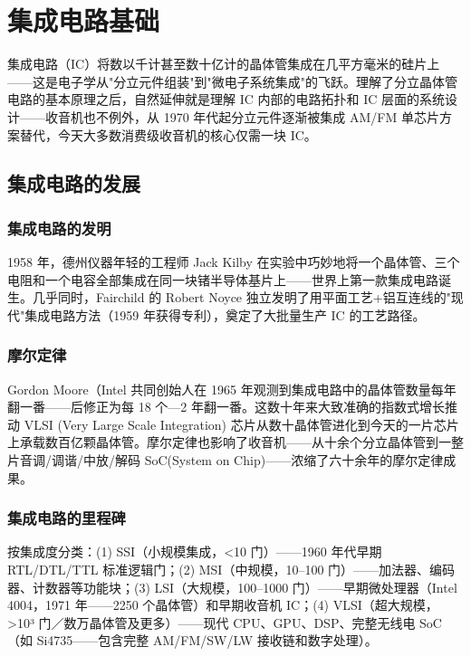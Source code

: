 \documentclass[12pt,UTF8]{ctexbook}
\begin{document}
\chapter{集成电路基础}
\label{chap:ic_basics}

集成电路（IC）将数以千计甚至数十亿计的晶体管集成在几平方毫米的硅片上——这是电子学从"分立元件组装"到"微电子系统集成"的飞跃。理解了分立晶体管电路的基本原理之后，自然延伸就是理解 IC 内部的电路拓扑和 IC 层面的系统设计——收音机也不例外，从 1970 年代起分立元件逐渐被集成 AM/FM 单芯片方案替代，今天大多数消费级收音机的核心仅需一块 IC。

\section{集成电路的发展}
\label{sec:ic_history}

\subsection{集成电路的发明}

1958 年，德州仪器年轻的工程师 Jack Kilby 在实验中巧妙地将一个晶体管、三个电阻和一个电容全部集成在同一块锗半导体基片上——世界上第一款集成电路诞生。几乎同时，Fairchild 的 Robert Noyce 独立发明了用平面工艺+铝互连线的"现代"集成电路方法（1959 年获得专利），奠定了大批量生产 IC 的工艺路径。

\subsection{摩尔定律}

Gordon Moore（Intel 共同创始人在 1965 年观测到集成电路中的晶体管数量每年翻一番——后修正为每 18 个—2 年翻一番。这数十年来大致准确的指数式增长推动 VLSI (Very Large Scale Integration) 芯片从数十晶体管进化到今天的一片芯片上承载数百亿颗晶体管。摩尔定律也影响了收音机——从十余个分立晶体管到一整片音调/调谐/中放/解码 SoC(System on Chip)——浓缩了六十余年的摩尔定律成果。

\subsection{集成电路的里程碑}

按集成度分类：(1) SSI（小规模集成，<10 门）——1960 年代早期 RTL/DTL/TTL 标准逻辑门；(2) MSI（中规模，10–100 门）——加法器、编码器、计数器等功能块；(3) LSI（大规模，100–1000 门）——早期微处理器（Intel 4004，1971 年——2250 个晶体管）和早期收音机 IC；(4) VLSI（超大规模，>10³ 门／数万晶体管及更多）——现代 CPU、GPU、DSP、完整无线电 SoC（如 Si4735——包含完整 AM/FM/SW/LW 接收链和数字处理）。
\end{document}
